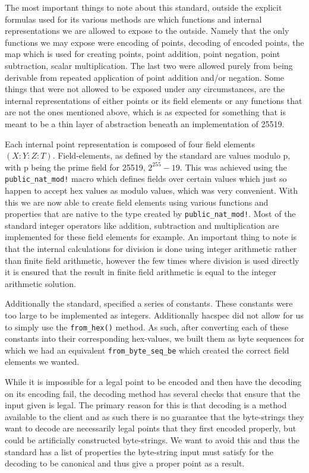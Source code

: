 \documentclass{article}
\begin{document}
The most important things to note about this standard, outside the
explicit formulas used for its various methods are which functions and
internal representations we are allowed to expose to the outside. Namely
that the only functions we may expose were encoding of points, decoding
of encoded points, the map which is used for creating points, point
addition, point negation, point subtraction, scalar multiplication. The
last two were allowed purely from being derivable from repeated
application of point addition and/or negation. Some things that were not
allowed to be exposed under any circumstances, are the internal
representations of either points or its field elements or any functions
that are not the ones mentioned above, which is as expected for something
that is meant to be a thin layer of abstraction beneath an implementation
of 25519.

Each internal point representation is composed of four field elements
$(X : Y : Z :T)$. Field-elements, as defined by the standard are values
modulo p, with p being the prime field for 25519, $2^{255} - 19$. This
was achieved using the \texttt{public\_nat\_mod!} macro which defines
fields over certain values which just so happen to accept hex values as
modulo values, which was very convenient. With this we are now able to
create field elements using various functions and properties that are
native to the type created by \texttt{public\_nat\_mod!}. Most of the
standard integer operators like addition, subtraction and multiplication
are implemented for these field elements for example. An important thing
to note is that the internal calculations for division is done using
integer arithmetic rather than finite field arithmetic, however the
few times where division is used directly it is ensured that the result
in finite field arithmetic is equal to the integer arithmetic solution.

Additionally the standard, specified a series of constants. These
constants were too large to be implemented as integers. Additionally
hacspec did not allow for us to simply use the \texttt{from\_hex()}
method. As such, after converting each of these constants into their
corresponding hex-values, we built them as byte sequences for which
we had an equivalent \texttt{from\_byte\_seq\_be} which created the
correct field elements we wanted.

While it is impossible for a legal point to be encoded and then have the
decoding on its encoding fail, the decoding method has several checks
that ensure that the input given is legal. The primary reason for this
is that decoding is a method available to the client and as such there is
no guarantee that the byte-strings they want to decode are necessarily
legal points that they first encoded properly, but could be artificially
constructed byte-strings. We want to avoid this and thus the standard has
a list of properties the byte-string input must satisfy for the decoding
to be canonical and thus give a proper point as a result. 
\end{document}

